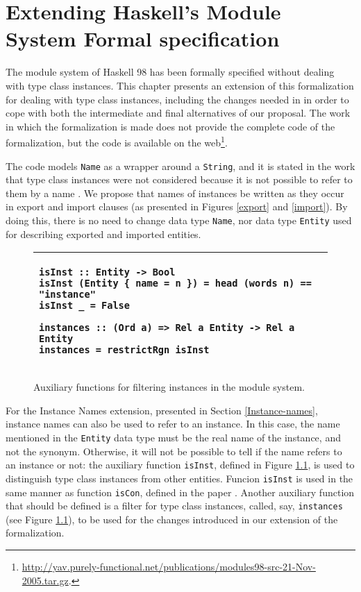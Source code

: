 \documentclass[msc]{ppgccufmg}
\begin{document}
\chapter[Extending the Module System specification]{Extending Haskell's Module System Formal specification}
\label{formal}
The module system of Haskell 98 has been formally specified
\citep{formal} without dealing with type class instances. This chapter
presents an extension of this formalization for dealing with type
class instances, including the changes needed in \citep{formal} in
order to cope with both the intermediate and final alternatives of our
proposal.  The work in which the formalization is made does not
provide the complete code of the formalization, but the code is
available on the
web\footnote{\url{http://yav.purely-functional.net/publications/modules98-src-21-Nov-2005.tar.gz}.}.

The code models \texttt{Name} as a wrapper around a \texttt{String},
and it is stated in the work that type class instances were not
considered because it is not possible to refer to them by a
name \citep[section~3.1]{formal}. We propose that names of instances be
written as they occur in export and import clauses (as presented in
Figures \ref{export} and \ref{import}).  By doing this, there is no
need to change data type \texttt{Name}, nor data type \texttt{Entity}
used for describing exported and imported entities.

\begin{figure}
\caption{Auxiliary functions for filtering instances in the module
  system.\label{new}}
\begin{tabular}{|p{\textwidth}|}
\hline
\begin{verbatim}
isInst :: Entity -> Bool
isInst (Entity { name = n }) = head (words n) == "instance"
isInst _ = False

instances :: (Ord a) => Rel a Entity -> Rel a Entity
instances = restrictRgn isInst
\end{verbatim}
\\
\hline
\end{tabular}
\end{figure}

For the Instance Names extension, presented in Section
\ref{Instance-names}, instance names can also be used to refer to an
instance. In this case, the name mentioned in the \texttt{Entity} data
type must be the real name of the instance, and not the synonym.
Otherwise, it will not be possible to tell if the name refers to an
instance or not: the auxiliary function \texttt{isInst}, defined in
Figure \ref{new}, is used to distinguish type class instances from
other entities. Funcion \texttt{isInst} is used in the same manner as
function \texttt{isCon}, defined in the paper \citep[section
  3.1]{formal}. Another auxiliary function that should be defined is a
filter for type class instances, called, say, \texttt{instances} (see
Figure \ref{new}), to be used for the changes introduced in our
extension of the formalization. 
\end{document}
